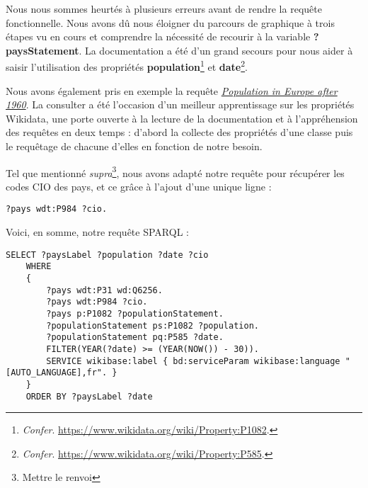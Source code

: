 \documentclass[hidelinks, 12pt]{article}
\begin{document}
		Nous nous sommes heurtés à plusieurs erreurs avant de rendre la requête fonctionnelle. Nous avons dû nous éloigner du parcours de graphique à trois étapes vu en cours et comprendre la nécessité de recourir à la variable \textbf{?paysStatement}. La documentation a été d'un grand secours pour nous aider à saisir l'utilisation des propriétés \textbf{population}\footnote{\emph{Confer}. \url{https://www.wikidata.org/wiki/Property:P1082}.} et \textbf{date}\footnote{\emph{Confer}. \url{https://www.wikidata.org/wiki/Property:P585}.}.
		
		Nous avons également pris en exemple la requête \href{https://query.wikidata.org/#%23Population%20in%20Europe%20after%201960%0ASELECT%20%20%3FobjectLabel%20%20%20%20%28YEAR%28%3Fdate%29%20as%20%3Fyear%29%0A%20%20%20%20%20%20%20%20%3Fpopulation%20%20%20%20%20%28%3FobjectLabel%20as%20%3FLocation%29%0AWHERE%0A%7B%0A%20%20%20%20%20%20%20%20wd%3AQ458%20wdt%3AP150%20%3Fobject%20.%20%20%20%23%20European%20Union%20%20contains%20administrative%20territorial%20entity%0A%20%20%20%20%20%20%20%20%3Fobject%20p%3AP1082%20%3FpopulationStatement%20.%0A%20%20%20%20%20%20%20%20%3FpopulationStatement%20%20%20%20ps%3AP1082%20%3Fpopulation%0A%20%20%20%20%20%20%20%20%3B%20pq%3AP585%20%3Fdate%20.%0A%20%20%20%20%20%20%20%20SERVICE%20wikibase%3Alabel%20%7B%20bd%3AserviceParam%20wikibase%3Alanguage%20%22%5BAUTO_LANGUAGE%5D%2Cen%22%20%7D%20%20%20%20%20%20%20%20%20%20%20%20%20%20%20%0A%20%20FILTER%20%28YEAR%28%3Fdate%29%20%3E%3D%201960%29%0A%7D%0AORDER%20BY%20%3FobjectLabel%20%3Fyear}{\emph{Population in Europe after 1960}}. La consulter a été l'occasion d'un meilleur apprentissage sur les propriétés Wikidata, une porte ouverte à la lecture de la documentation et à l'appréhension des requêtes en deux temps : d'abord la collecte des propriétés d'une classe puis le requêtage de chacune d'elles en fonction de notre besoin.
		
		Tel que mentionné \emph{supra}\footnote{Mettre le renvoi}, nous avons adapté notre requête pour récupérer les codes CIO des pays, et ce grâce à l'ajout d'une unique ligne :
		
\begin{lstlisting}[language=SPARQL]
	?pays wdt:P984 ?cio.
\end{lstlisting}
		
		Voici, en somme, notre requête SPARQL :
		
\begin{lstlisting}[language=SPARQL]
	SELECT ?paysLabel ?population ?date ?cio
	WHERE 
	{
		?pays wdt:P31 wd:Q6256.
		?pays wdt:P984 ?cio.
		?pays p:P1082 ?populationStatement.
		?populationStatement ps:P1082 ?population. 
		?populationStatement pq:P585 ?date.
		FILTER(YEAR(?date) >= (YEAR(NOW()) - 30)).
		SERVICE wikibase:label { bd:serviceParam wikibase:language "[AUTO_LANGUAGE],fr". }
	}
	ORDER BY ?paysLabel ?date
\end{lstlisting}
		
\end{document}
